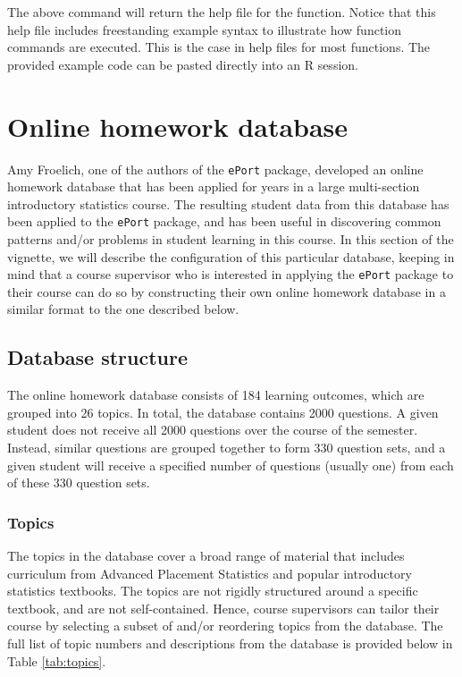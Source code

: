 \documentclass{article}\usepackage[]{graphicx}\usepackage[]{color}
\numberwithin{equation}{section} %
\newcommand{\R}{{\normalfont\textsf{R }}{}}
\begin{document}
The above command will return the help file for the function. Notice that this help file includes freestanding example syntax to illustrate how function commands are executed. This is the case in help files for most functions. The provided example code can be pasted directly into an \R session.

\section{Online homework database}
\label{sec:OnlineHomework}

Amy Froelich, one of the authors of the \texttt{ePort} package, developed an online homework database that has been applied for years in a large multi-section introductory statistics course. The resulting student data from this database has been applied to the \texttt{ePort} package, and has been useful in discovering common patterns and/or problems in student learning in this course. In this section of the vignette, we will describe the configuration of this particular database, keeping in mind that a course supervisor who is interested in applying the \texttt{ePort} package to their course can do so by constructing their own online homework database in a similar format to the one described below.

\subsection{Database structure}

The online homework database consists of 184 learning outcomes, which are grouped into 26 topics. In total, the database contains 2000 questions. A given student does not receive all 2000 questions over the course of the semester. Instead, similar questions are grouped together to form 330 question sets, and a given student will receive a specified number of questions (usually one) from each of these 330 question sets.

\subsubsection{Topics}

The topics in the database cover a broad range of material that includes curriculum from Advanced Placement Statistics and popular introductory statistics textbooks. The topics are not rigidly structured around a specific textbook, and are not self-contained. Hence, course supervisors can tailor their course by selecting a subset of and/or reordering topics from the database. The full list of topic numbers and descriptions from the database is provided below in Table \ref{tab:topics}.
\end{document}
